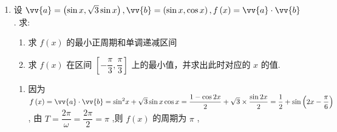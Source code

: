 \begin{enumerate}
\begin{enumerate}
\begin{jieda}
            $= \dfrac{1}{2}\sin \left( {{2\omega x} - \dfrac{\pi }{2}}\right)  + \dfrac{1 - \cos {2\omega x}}{2} + \sqrt{3}\sin {2\omega x} - \dfrac{1}{2}$
            
            $=  - \dfrac{1}{2}\cos {2\omega x} + \dfrac{1 - \cos {2\omega x}}{2} + \sqrt{3}\sin {2\omega x} - \dfrac{1}{2} = \sqrt{3}\sin {2\omega x} - \cos {2\omega x} + \dfrac{1}{2} - \dfrac{1}{2}$ ,
            
            $= 2\sin \left( {{2\omega x} - \dfrac{\pi }{6}}\right)$ .
            
            因为函数 $g\left( x\right)  = \vv{a} \cdot  \vv{b} - \dfrac{1}{2}$ 的两个相邻的零点间的距离为 $\dfrac{\pi }{2}$ ,所以 $\dfrac{\pi }{2} \times  2 = \dfrac{2\pi }{2\omega },\therefore \omega  = 1$ .
            
            所以 $f\left( x\right)  = \vv{a} \cdot  \vv{b} = 2\sin \left( {{2x} - \dfrac{\pi }{6}}\right)  + \dfrac{1}{2}$ .
            
            令 $f\left( {x}_{0}\right)  = 0$ ,则 $\sin \left( {2{x}_{0} - \dfrac{\pi }{6}}\right)  =  - \dfrac{1}{4}$ ,
            
            因为 $0 \leq  {x}_{0} \leq  \dfrac{\pi }{2}$ ,所以 $2{x}_{0} - \dfrac{\pi }{6} \in  \left\lbrack  {-\dfrac{\pi }{6},\dfrac{5\pi }{6}}\right\rbrack$ ,
            
            由 $\sin \left( {2{x}_{0} - \dfrac{\pi }{6}}\right)  =  - \dfrac{1}{4} < 0$ ,故 $2{x}_{0} - \dfrac{\pi }{6} \in  \left\lbrack  {-\dfrac{\pi }{6},0}\right) ,\therefore \cos \left( {2{x}_{0} - \dfrac{\pi }{6}}\right)  = \dfrac{\sqrt{15}}{4}$ .
            
            所以 $\cos 2{x}_{0} = \cos \left\lbrack  {\left( {2{x}_{0} - \dfrac{\pi }{6}}\right)  + \dfrac{\pi }{6}}\right\rbrack   = \dfrac{\sqrt{15}}{4} \cdot  \dfrac{\sqrt{3}}{2} - \left( {-\dfrac{1}{4}}\right)  \cdot  \dfrac{1}{2} = \dfrac{3\sqrt{5} + 1}{8}$ .
        \end{jieda}
        \item 设 $\vv{a} = \left( {\sin x,\sqrt{3}\sin x}\right) ,\vv{b} = \left( {\sin x,\cos x}\right) ,f\left( x\right)  = \vv{a} \cdot  \vv{b}$ . 求:
        \begin{enumerate}
            \item 求 $f\left( x\right)$ 的最小正周期和单调递减区间
            \item 求 $f\left( x\right)$ 在区间 $\left\lbrack  {-\dfrac{\pi }{3},\dfrac{\pi }{3}}\right\rbrack$ 上的最小值，并求出此时对应的 $x$ 的值.
        \end{enumerate}
        \begin{jieda}
            \begin{enumerate}
                \item 因为 $f\left( x\right)  = \vv{a} \cdot  \vv{b} = {\sin }^{2}x + \sqrt{3}\sin x\cos x = \dfrac{1 - \cos {2x}}{2} + \sqrt{3} \times  \dfrac{\sin {2x}}{2} = \dfrac{1}{2} + \sin \left( {{2x} - \dfrac{\pi }{6}}\right)$ , 由 $T = \dfrac{2\pi }{\omega } = \dfrac{2\pi }{2} = \pi$ ,则 $f\left( x\right)$ 的周期为 $\pi$ ,
                

\end{enumerate}
\end{jieda}
\end{enumerate}
\end{enumerate}
